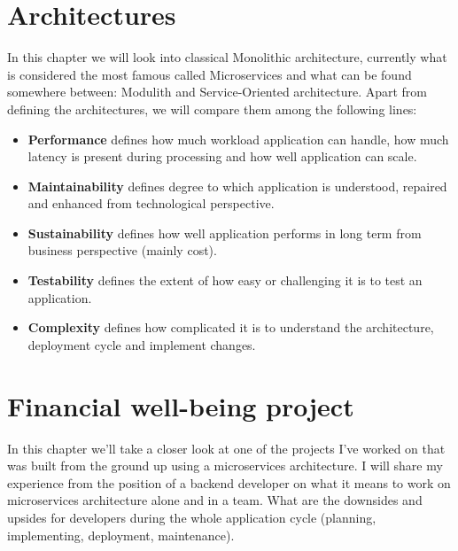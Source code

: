 \chapter{Architectures}
\label{chapter:architectures}
In this chapter we will look into classical Monolithic architecture, currently what is considered the most famous called Microservices and what can be found somewhere between: Modulith and Service-Oriented architecture. Apart from defining the architectures, we will compare them among the following lines:
\begin{itemize}
    \item \textbf{Performance} defines how much workload application can handle, how much latency is present during processing and how well application can scale.
    \item \textbf{Maintainability} defines degree to which application is understood, repaired and enhanced from technological perspective.  \cite{SOFTWARE_MAINTAINABILITY}
    \item \textbf{Sustainability} defines how well application performs in long term from business perspective (mainly cost).
    \item \textbf{Testability} defines the extent of how easy or challenging it is to test an application.
    \item \textbf{Complexity} defines how complicated it is to understand the architecture, deployment cycle and implement changes.
\end{itemize}







\chapter{Financial well-being project}
\label{chapter:personal_experience}
In this chapter we'll take a closer look at one of the projects I've worked on that was built from the ground up using a microservices architecture. I will share my experience from the position of a backend developer on what it means to work on microservices architecture alone and in a team. What are the downsides and upsides for developers during the whole application cycle (planning, implementing, deployment, maintenance).



